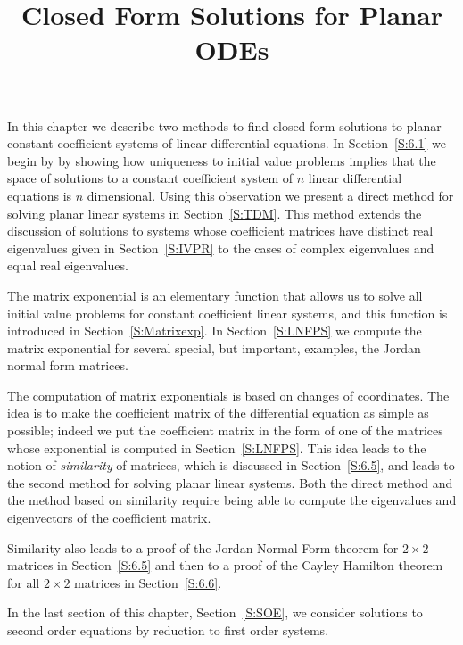 \documentclass{ximera}
\title{Closed Form Solutions for Planar ODEs}
\begin{document}
\begin{abstract}
\end{abstract}
\maketitle


\label{Chap:Planar}

\normalsize

In this chapter we describe two methods to find closed form
solutions to planar constant coefficient systems of linear differential
equations.  In Section~\ref{S:6.1} we begin by by showing how uniqueness to
initial value problems implies that the space of solutions to a constant
coefficient system of $n$ linear differential equations is $n$ dimensional.
Using this observation we present a direct method for solving planar linear
systems in Section~\ref{S:TDM}.  This method extends the discussion of
solutions to systems whose coefficient matrices have distinct real
eigenvalues given in Section~\ref{S:IVPR} to the cases of complex
eigenvalues and equal real eigenvalues.

The matrix exponential is an elementary function that allows us to solve
all initial value problems for constant coefficient linear systems, and
this function is introduced in Section~\ref{S:Matrixexp}.  In
Section~\ref{S:LNFPS} we compute the matrix exponential for several
special, but important, examples, the Jordan normal form matrices.

The computation of matrix exponentials is
based on changes of coordinates.  The idea is to make the coefficient matrix
of the differential equation as simple as possible; indeed we put the
coefficient matrix in the form of one of the matrices whose exponential is
computed in Section~\ref{S:LNFPS}.  This idea leads to the notion of
{\em similarity\/} of matrices, which is discussed in Section~\ref{S:6.5}, and
leads to the second method for solving planar linear systems. Both the direct
method and the method based on similarity require being able to compute the
eigenvalues and eigenvectors of the coefficient matrix.

Similarity also leads to a proof of the Jordan Normal Form theorem for 
$2\times 2$ matrices in Section~\ref{S:6.5} and then to a proof of the Cayley 
Hamilton theorem for all $2\times 2$ matrices in Section~\ref{S:6.6}.

In the last section of this chapter, Section~\ref{S:SOE}, we consider
solutions to second order equations by reduction to first order systems.
\end{document}
